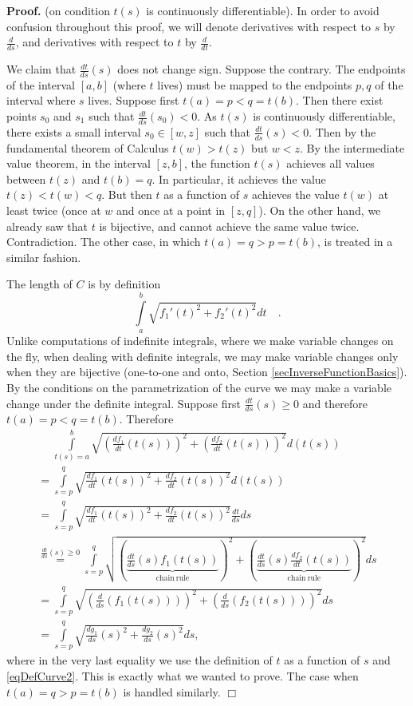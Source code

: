 \documentclass[12pt]{book}
\newenvironment{proof}[1][]{ \textbf{Proof#1.} }{$\Box$\medskip}
\begin{document}
\begin{proof} (on condition $t(s)$ is continuously differentiable). In order to avoid confusion throughout this proof, we will denote derivatives with respect to $s$ by $\frac{d}{ds}$, and derivatives with respect to $t$ by $\frac{d}{dt}$. 

We claim that $\frac{dt}{ds}(s)$ does not change sign. Suppose the contrary. The endpoints of the interval $[a,b]$ (where $t$ lives) must be mapped to the endpoints $p,q$ of the interval where $s$ lives. Suppose first $t(a)=p<q=t(b)$.  Then there exist points $s_0$ and $s_1$ such that  $\frac{dt}{ds}(s_0)<0$. As $t(s)$ is continuously differentiable, there exists a small interval  $s_0\in [w, z]$ such that $\frac{dt}{ds}(s)<0$. Then by the fundamental theorem of Calculus $t(w)>t(z)$ but $w<z$. By the intermediate value theorem, in the interval $[z,b]$, the function $t(s)$ achieves all values between $t(z)$ and $t(b)=q$. In particular, it achieves the value $t(z)<t(w)<q$. But then $t$ as a function of $s$ achieves the value $t(w)$ at least twice (once at $w$ and once at a point in $[z,q]$). On the other hand, we already saw that $t$ is bijective, and cannot achieve the same value twice. Contradiction. The other case, in which $t(a)=q>p=t(b)$, is treated in a similar fashion.

The length of $C$ is by definition 
\[
\int\limits_{a}^b \sqrt{f_1'(t)^2+f_2'(t)^2}dt \quad . 
\]
Unlike computations of indefinite integrals, where we make variable changes on the fly, when dealing with definite integrals, we may make variable changes only when they are bijective (one-to-one and onto, Section \ref{secInverseFunctionBasics}). By the conditions on the parametrization of the curve we may make a variable change under the definite integral. Suppose first $\frac{dt}{ds}(s)\geq 0$ and therefore $t(a)=p<q=t(b)$. Therefore
\[
\begin{array}{l}
\phantom{=}\displaystyle \int\limits_{t(s)=a}^b \sqrt{\left(\frac{df_1}{dt}(t(s))\right)^2+\left(\frac{df_2}{dt}(t(s))\right)^2}d(t(s)) \\
\displaystyle =  \int \limits_{s=p}^q \sqrt{\frac{df_1}{dt}( t(s))^2+ \frac{df_2}{dt}(t(s))^2}d(t(s))\\
= \displaystyle \int\limits_{s=p}^q \sqrt{\frac{df_1}{dt}( t(s))^2+\frac{df_2}{dt}(t(s))^2} \frac{dt}{ds}ds \\
\displaystyle
\stackrel{\frac{dt}{ds}(s)\geq 0}{=}  \int\limits_{s=p}^q \sqrt{ \left(\underbrace{\frac{dt}{ds}(s) f_1( t(s)) }_{ \mathrm{chain~rule}} \right)^2+ \left( \underbrace{ \frac{ dt}{ds}(s) \frac{df_2}{dt} (t(s))}_{ \mathrm{chain~rule}} \right)^2}ds \\
=\displaystyle \int\limits_{s=p}^q \sqrt{ \left(\frac{d}{ds}\left(f_1(t(s))\right)\right)^2+ \left(\frac{d}{ds}\left(f_2(t(s))\right)\right)^2}ds \\
=\displaystyle \int\limits_{s=p}^q \sqrt{ \frac{ dg_1}{ ds}( s)^2 + \frac{dg_2}{ds}(s)^2}ds,
\quad
\end{array}
\]
where in the very last equality we use the definition of $t$ as a function of $s$ and \eqref{eqDefCurve2}. This is exactly what we wanted to prove. The case when $t(a)=q>p=t(b)$ is handled similarly.
\end{proof}
\end{document}
